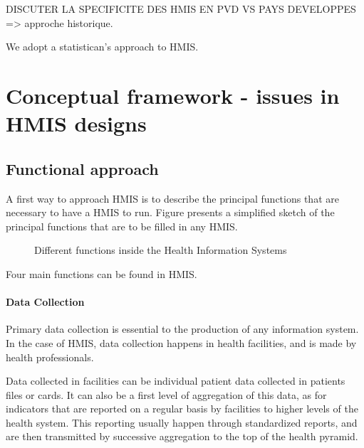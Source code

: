 \documentclass[a4paper,11pt,final,twoside]{article}
\begin{document}
DISCUTER LA SPECIFICITE DES HMIS EN PVD VS PAYS DEVELOPPES  => approche historique.

We adopt a statistican's approach to HMIS. 


\section{Conceptual framework - issues in HMIS designs}

	\subsection{Functional approach}
	\label{sec_function}
	
A first way to approach HMIS is to describe the principal functions that are necessary to have a HMIS to run. Figure \cite{HMISFunctions} presents a simplified sketch of the principal functions that are to be filled in any HMIS. 

\begin{figure}[h]
\begin{center}
\end{center}
\caption{Different functions inside the Health Information Systems}
\label{HMISFunctions}
\end{figure}           

Four main functions can be found in HMIS. 

\paragraph{Data Collection} Primary data collection is essential to the production of any information system. In the case of HMIS, data collection happens in health facilities, and is made by health professionals.

Data collected in facilities can be individual patient data collected in patients files or cards. It can also be a first level of aggregation of this data, as for indicators that are reported on a regular basis by facilities to higher levels of the health system. This reporting usually happen through standardized reports, and are then transmitted by successive aggregation to the top of the health pyramid.
\end{document}

